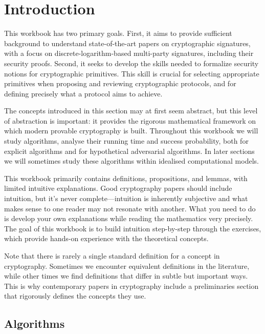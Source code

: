 \section{Introduction}\label{sec:intro}

This workbook has two primary goals.
First, it aims to provide sufficient background to understand state-of-the-art papers on cryptographic signatures, with a focus on discrete-logarithm-based multi-party signatures, including their security proofs.
Second, it seeks to develop the skills needed to formalize security notions for cryptographic primitives.
This skill is crucial for selecting appropriate primitives when proposing and reviewing cryptographic protocols, and for defining precisely what a protocol aims to achieve.

The concepts introduced in this section may at first seem abstract, but this level of abstraction is important: it provides the rigorous mathematical framework on which modern provable cryptography is built.
Throughout this workbook we will study algorithms, analyse their running time and success probability, both for explicit algorithms and for hypothetical adversarial algorithms.
In later sections we will sometimes study these algorithms within idealised computational models.

This workbook primarily contains definitions, propositions, and lemmas, with limited intuitive explanations.
Good cryptography papers should include intuition, but it's never complete---intuition is inherently subjective and what makes sense to one reader may not resonate with another.
What you need to do is develop your own explanations while reading the mathematics very precisely.
The goal of this workbook is to build intuition step-by-step through the exercises, which provide hands-on experience with the theoretical concepts.

Note that there is rarely a single standard definition for a concept in cryptography.
Sometimes we encounter equivalent definitions in the literature, while other times we find definitions that differ in subtle but important ways.
This is why contemporary papers in cryptography include a preliminaries section that rigorously defines the concepts they use.


\subsection{Algorithms}

